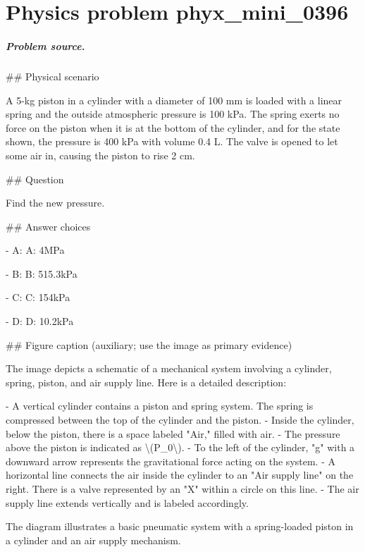 
\chapter{Physics problem phyx\_mini\_0396}
\label{ch:PhyXMiniProblems_problem_phyx_mini_0396}

\paragraph{Problem source.}
\#\# Physical scenario

A 5-kg piston in a cylinder with a diameter of 100 mm is loaded with a linear spring and the outside atmospheric pressure is 100 kPa. The spring exerts no force on the piston when it is at the bottom of the cylinder, and for the state shown, the pressure is 400 kPa with volume 0.4 L. The valve is opened to let some air in, causing the piston to rise 2 cm.

\#\# Question

Find the new pressure.

\#\# Answer choices

- A: A: 4MPa

- B: B: 515.3kPa

- C: C: 154kPa

- D: D: 10.2kPa

\#\# Figure caption (auxiliary; use the image as primary evidence)

The image depicts a schematic of a mechanical system involving a cylinder, spring, piston, and air supply line. Here is a detailed description:

- A vertical cylinder contains a piston and spring system. The spring is compressed between the top of the cylinder and the piston.
- Inside the cylinder, below the piston, there is a space labeled "Air," filled with air.
- The pressure above the piston is indicated as \textbackslash{}(P\_0\textbackslash{}).
- To the left of the cylinder, "g" with a downward arrow represents the gravitational force acting on the system.
- A horizontal line connects the air inside the cylinder to an "Air supply line" on the right. There is a valve represented by an "X" within a circle on this line.
- The air supply line extends vertically and is labeled accordingly.

The diagram illustrates a basic pneumatic system with a spring-loaded piston in a cylinder and an air supply mechanism.

